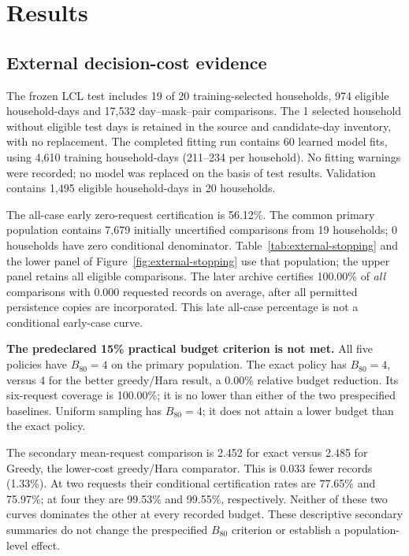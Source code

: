 \documentclass[12pt]{article}
\begin{document}
\section{Results}
\subsection{External decision-cost evidence}\label{sec:external-results}
The frozen LCL test includes 19 of 20 training-selected households, 974 eligible household-days and 17,532 day--mask--pair comparisons. The 1 selected household without eligible test days is retained in the source and candidate-day inventory, with no replacement. The completed fitting run contains 60 learned model fits, using 4,610 training household-days (211--234 per household). No fitting warnings were recorded; no model was replaced on the basis of test results. Validation contains 1,495 eligible household-days in 20 households.

The all-case early zero-request certification is 56.12\%. The common primary population contains 7,679 initially uncertified comparisons from 19 households; 0 households have zero conditional denominator. Table~\ref{tab:external-stopping} and the lower panel of Figure~\ref{fig:external-stopping} use that population; the upper panel retains all eligible comparisons. The later archive certifies 100.00\% of \emph{all} comparisons with 0.000 requested records on average, after all permitted persistence copies are incorporated. This late all-case percentage is not a conditional early-case curve.

\textbf{The predeclared 15\% practical budget criterion is not met.} All five policies have $B_{80}=4$ on the primary population. The exact policy has $B_{80}=4$, versus 4 for the better greedy/Hara result, a 0.00\% relative budget reduction. Its six-request coverage is 100.00\%; it is no lower than either of the two prespecified baselines. Uniform sampling has $B_{80}=4$; it does not attain a lower budget than the exact policy.

The secondary mean-request comparison is 2.452 for exact versus 2.485 for Greedy, the lower-cost greedy/Hara comparator. This is 0.033 fewer records (1.33\%). At two requests their conditional certification rates are 77.65\% and 75.97\%; at four they are 99.53\% and 99.55\%, respectively. Neither of these two curves dominates the other at every recorded budget. These descriptive secondary summaries do not change the prespecified $B_{80}$ criterion or establish a population-level effect.
\end{document}
